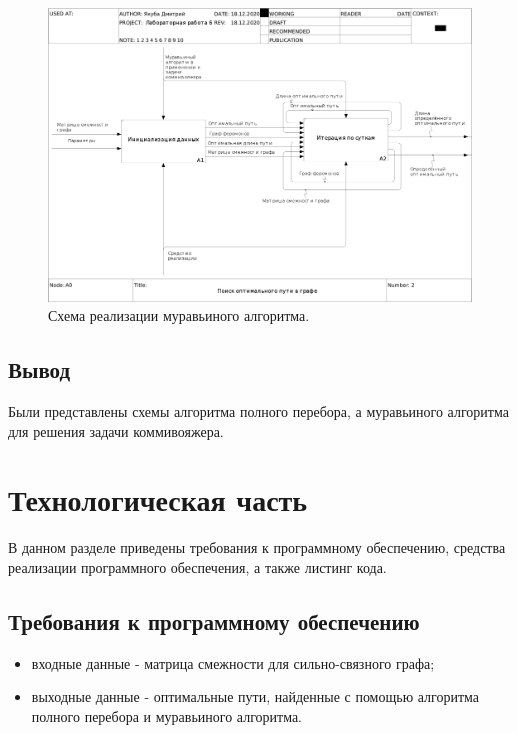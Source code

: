 \documentclass[12pt]{report}
\begin{document}
\begin{figure}[ht]
\begin{center}
\includegraphics[scale=0.27]{inc/Ramus/02_A0.png}
\captionsetup{justification=centering}
	\caption{Схема реализации муравьиного алгоритма.}
	\label{img:antAlg2}	
\end{center}
\end{figure}

\section*{Вывод}
Были представлены схемы алгоритма полного перебора, а муравьиного алгоритма для решения задачи коммивояжера.

\chapter{Технологическая часть}
В данном разделе приведены требования к программному обеспечению, средства реализации программного обеспечения, а также листинг кода.

\section{Требования к программному обеспечению}
\begin{itemize}
\item входные данные - матрица смежности для сильно-связного графа;
\item выходные данные - оптимальные пути, найденные с помощью алгоритма полного перебора и муравьиного алгоритма.
\end{itemize}
\end{document}
